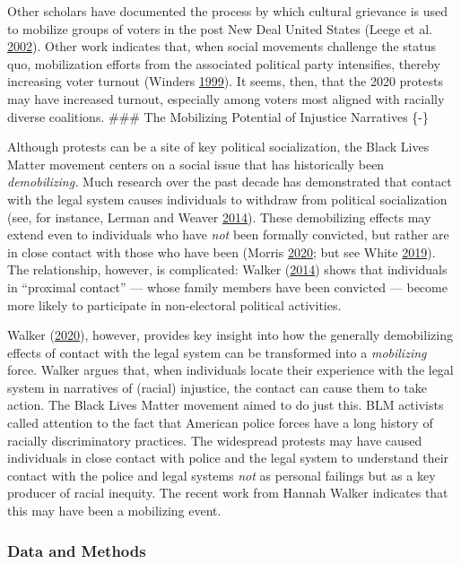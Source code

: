 \documentclass[
  12pt,
]{article}
\begin{document}
Other scholars have documented the process by which cultural grievance is used to mobilize groups of voters in the post New Deal United States (Leege et al. \protect\hyperlink{ref-Leege2002}{2002}). Other work indicates that, when social movements challenge the status quo, mobilization efforts from the associated political party intensifies, thereby increasing voter turnout (Winders \protect\hyperlink{ref-Winders1999}{1999}). It seems, then, that the 2020 protests may have increased turnout, especially among voters most aligned with racially diverse coalitions.
\#\#\# The Mobilizing Potential of Injustice Narratives \{-\}

Although protests can be a site of key political socialization, the Black Lives Matter movement centers on a social issue that has historically been \emph{demobilizing.} Much research over the past decade has demonstrated that contact with the legal system causes individuals to withdraw from political socialization (see, for instance, Lerman and Weaver \protect\hyperlink{ref-Lerman2014}{2014}). These demobilizing effects may extend even to individuals who have \emph{not} been formally convicted, but rather are in close contact with those who have been (Morris \protect\hyperlink{ref-Morris2020}{2020}; but see White \protect\hyperlink{ref-White2019}{2019}). The relationship, however, is complicated: Walker (\protect\hyperlink{ref-Walker2014}{2014}) shows that individuals in ``proximal contact'' --- whose family members have been convicted --- become more likely to participate in non-electoral political activities.

Walker (\protect\hyperlink{ref-Walker2020}{2020}), however, provides key insight into how the generally demobilizing effects of contact with the legal system can be transformed into a \emph{mobilizing} force. Walker argues that, when individuals locate their experience with the legal system in narratives of (racial) injustice, the contact can cause them to take action. The Black Lives Matter movement aimed to do just this. BLM activists called attention to the fact that American police forces have a long history of racially discriminatory practices. The widespread protests may have caused individuals in close contact with police and the legal system to understand their contact with the police and legal systems \emph{not} as personal failings but as a key producer of racial inequity. The recent work from Hannah Walker indicates that this may have been a mobilizing event.

\hypertarget{data-and-methods}{%
\subsubsection*{Data and Methods}\label{data-and-methods}}
\end{document}
